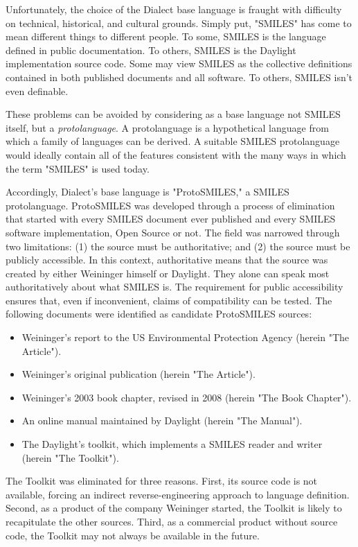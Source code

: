 \documentclass{article}
\begin{document}
Unfortunately, the choice of the Dialect base language is fraught with difficulty on technical, historical, and cultural grounds. Simply put, "SMILES" has come to mean different things to different people. To some, SMILES is the language defined in public documentation. To others, SMILES is the Daylight implementation source code. Some may view SMILES as the collective definitions contained in both published documents and all software. To others, SMILES isn't even definable.

These problems can be avoided by considering as a base language not SMILES itself, but a \textit{protolanguage}. A protolanguage is a hypothetical language from which a family of languages can be derived. A suitable SMILES protolanguage would ideally contain all of the features consistent with the many ways in which the term "SMILES" is used today.

Accordingly, Dialect's base language is "ProtoSMILES," a SMILES protolanguage. ProtoSMILES was developed through a process of elimination that started with every SMILES document ever published and every SMILES software implementation, Open Source or not. The field was narrowed through two limitations: (1) the source must be authoritative; and (2) the source must be publicly accessible. In this context, authoritative means that the source was created by either Weininger himself or Daylight. They alone can speak most authoritatively about what SMILES is. The requirement for public accessibility ensures that, even if inconvenient, claims of compatibility can be tested. The following documents were identified as candidate ProtoSMILES sources:

\begin{itemize}
    \item Weininger's report to the US Environmental Protection Agency (herein "The Article").\cite{anderson:1987}
    \item Weininger's original publication (herein "The Article").\cite{weininger:1988}
    \item Weininger's 2003 book chapter, revised in 2008 (herein "The Book Chapter").\cite{weininger:2008}
    \item An online manual maintained by Daylight (herein "The Manual").
    \item The Daylight's toolkit, which implements a SMILES reader and writer (herein "The Toolkit").\cite{daylightToolkit}
\end{itemize}

The Toolkit was eliminated for three reasons. First, its source code is not available, forcing an indirect reverse-engineering approach to language definition. Second, as a product of the company Weininger started, the Toolkit is likely to recapitulate the other sources. Third, as a commercial product without source code, the Toolkit may not always be available in the future.
\end{document}
